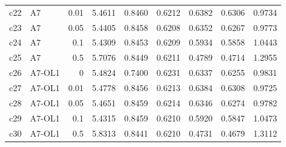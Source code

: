 \begin{tabular}{@{}llrrrrrrr@{}}
c22 & A7 & 0.01 & 5.4611 & 0.8460 & 0.6212 & 0.6382 & 0.6306 & 0.9734 \\
c23 & A7 & 0.05 & 5.4405 & 0.8458 & 0.6208 & 0.6352 & 0.6267 & 0.9773 \\
c24 & A7 & 0.1 & 5.4309 & 0.8453 & 0.6209 & 0.5934 & 0.5858 & 1.0443 \\
c25 & A7 & 0.5 & 5.7076 & 0.8449 & 0.6211 & 0.4789 & 0.4714 & 1.2955 \\
c26 & A7-OL1 & 0 & 5.4824 & 0.7400 & 0.6231 & 0.6337 & 0.6255 & 0.9831 \\
c27 & A7-OL1 & 0.01 & 5.4778 & 0.8456 & 0.6213 & 0.6384 & 0.6308 & 0.9725 \\
c28 & A7-OL1 & 0.05 & 5.4651 & 0.8459 & 0.6214 & 0.6346 & 0.6274 & 0.9782 \\
c29 & A7-OL1 & 0.1 & 5.4315 & 0.8459 & 0.6210 & 0.5920 & 0.5847 & 1.0473 \\
c30 & A7-OL1 & 0.5 & 5.8313 & 0.8441 & 0.6210 & 0.4731 & 0.4679 & 1.3112 \\
\bottomrule
\end{tabular}
